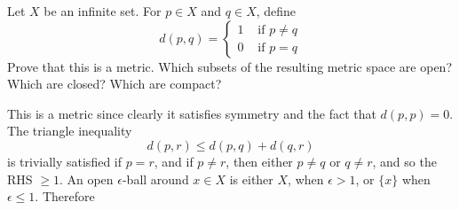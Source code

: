 \documentclass{article}
\begin{document}
    \begin{exercise}[Rudin 2.10]
    Let $X$ be an infinite set. For $p \in X$ and $q \in X$, define 
    \[d(p, q) = \begin{cases} 1 & \text{ if } p \neq q \\ 0 & \text{ if } p = q \end{cases}\]
    Prove that this is a metric. Which subsets of the resulting metric space are open? Which are closed? Which are compact? 
    \end{exercise}
    \begin{solution}
    This is a metric since clearly it satisfies symmetry and the fact that $d(p, p) = 0$. The triangle inequality 
    \[d(p, r) \leq d(p, q) + d(q, r)\]
    is trivially satisfied if $p = r$, and if $p \neq r$, then either $p \neq q$ or $q \neq r$, and so the RHS $\geq 1$. An open $\epsilon$-ball around $x \in X$ is either $X$, when $\epsilon > 1$, or $\{x\}$ when $\epsilon \leq 1$. Therefore 
    \end{solution}
\end{document}
